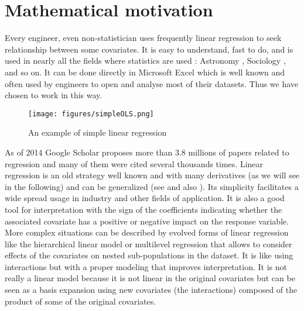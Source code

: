 \documentclass[12pt,a4paper]{report}
\begin{document}
	\section{Mathematical motivation}
	
		Every engineer, even non-statistician uses frequently linear regression to seek relationship between some covariates. It is easy to understand, fast to do, and is used in nearly all the fields where statistics are used \cite{montgomery2012introduction}: Astronomy \cite{isobe1990linear}, Sociology \cite{longford2012revision}, and so on. It can be done directly in Microsoft Excel which is well known and often used by engineers to open and analyse most of their datasets. Thus we have chosen to work in this way.\\
		 
\begin{figure}
\centering
	\texttt{[image: figures/simpleOLS.png]} 
	\caption{An example of simple linear regression}
\end{figure}		 
		 
		 As of 2014 Google Scholar proposes more than $3.8$ millions of papers related to regression and many of them were cited several thousands times. Linear regression is an old strategy well known and with many derivatives (as we will see in the following) and can be generalized (see \cite{kiebel2003general,wickens2004general,nelder1972generalized} and also \cite{mccullagh1989generalized}). 
	Its simplicity facilitates a wide spread usage in industry and other fields of application. It is also a good tool for interpretation with the sign of the coefficients indicating whether the associated covariate has a positive or negative impact on the response variable. \\
	
	More complex situations can be described by evolved forms of linear regression like the hierarchical linear model \cite{raudenbush2002hierarchical,woltman2012introduction}  or  multilevel regression \cite{moerbeek2003comparison,maas2004robustness,hox1998multilevel} that allows to consider effects of the covariates on nested sub-populations in the dataset. It is like using interactions but with a proper modeling that improves interpretation. It is not really a linear model because it is not linear in the original covariates but can be seen as a basis expansion using new covariates (the interactions) composed of the product of some of the original covariates.\\
	
\end{document}
